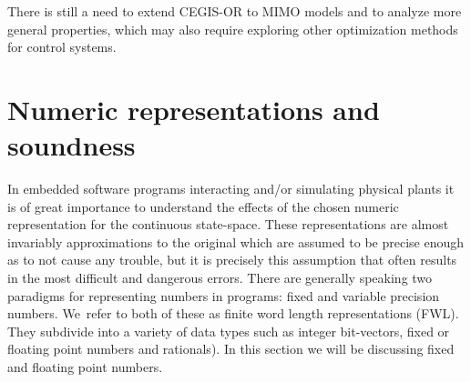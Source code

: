 \documentclass[sigconf]{llncs}
\begin{document}
There is still a need to extend CEGIS-OR to MIMO models and to analyze more
general properties, which may also require exploring other optimization
methods for control systems.

\newpage


\newpage
\appendix

\section{Numeric representations and soundness} \label{sec:numeric_rep}

In embedded software programs interacting and/or simulating physical plants
it is of great importance to understand the effects of the chosen numeric
representation for the continuous state-space.  These representations are
almost invariably approximations to the original which are assumed to be
precise enough as to not cause any trouble, but it is precisely this
assumption that often results in the most difficult and dangerous errors. 
There are generally speaking two paradigms for representing numbers in
programs: fixed and variable precision numbers.  We~refer to both of these
as finite word length representations (FWL).  They subdivide into a variety
of data types such as integer bit-vectors, fixed or floating point numbers
and rationals).  In this section we will be discussing fixed and floating
point numbers.
\end{document}
